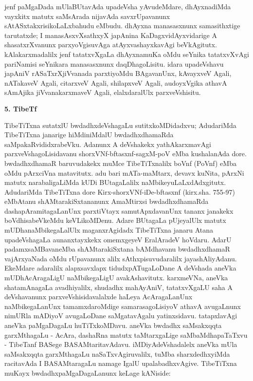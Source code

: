 jenf paMgaDada mUlaBUtavAda upadeVsha yAvudeMdare, dhAyxnadiMda vayxkitx matutx saMsArada nijavAda savxrUpavanunx sAtASxtakxrisikoLaLxbahudu eMbudu. dhAyxna manasasxnunx samasithxtige tarutatxde; I manasAsxvXsathxyX japAnina KaDagxvidAyxvidarige A shasatxrXvanunx parxyoVgisuvAga atAyxvashayxkavAgi beVkAgitutx. kAlakarxmadalilx jenf tatatxvXgaLa dhAyxnamuKa oMdu seYnika tatatxvXvAgi pariNamisi seYnikara manasasxnunx daqDhagoLisitu. idara upadeVshavu japAniV rASaTxrXjiVvanada parxtiyoMdu BAgavanUnx, kAvayxveV Agali, nATakaveV Agali, citarxveV Agali, shilapxveV Agali, audoyxVgika athavA sAmAjika jiVvanakarxmaveV Agali, elalxdaralUlx parxveVshisitu.

\begin{center}
{\textbf{\Large 5. TibeTf}}
\end{center}

TibeTiTxna sutatxlU bwdadhxdeVshagaLu sutitxkoMDidadxvu; AdudariMda TibeTiTxna janarige hiMdiniMdalU bwdadhxdhamaRda saMpakaRvididxrabeVku. Adanunx A deVshakekx yathAkarxmavAgi parxveVshagoLisidavanu shorxVNf-bftasxnf-sagxM-poV eMba kushalanAda dore. bwdadhxdhamaR baruvudakekx muMce TibeTiTxnalilx boVnf (PoVnf) eMba oMdu pArxciVna matavitutx. adu bari mATa-maMtarx, devavx kuNita, pArxNi matutx narabaligaLiMda kUDi BUtagaLalilx naMbikeyuLaLxdAdxgitutx. AdudariMda TibeTiTxna dore Kirx-shorxVNf-iDe-bftasxnf (kirx.sha. 755-97) eMbAtanu shAMtarakiSxtananunx AmaMtirxsi bwdadhxdhamaRda dashapAramitagaLanUnx parxtiVtayx samutApxdavanUnx tananx janakekx boVdhisabeVkeMdu keVLikoMDenu. Adare BUtagaLa pUjeyalUlx matutx mUDhanaMbikegaLalUlx maganxrAgidadx TibeTiTxna janaru Atana upadeVshagaLa aunanxtayxkekx omemxgeyeV EralAradeV hoVdaru. AdarU padamxsaMBavaneMba shAMtarakiSxtana bAMdhavanu bwdadhxdhamaR vajArxyaNada oMdu rUpavanunx alilx sAthxpisuvudaralilx jayashAliyAdanu. EkeMdare adaralilx alapxsavxlapx tidudxpATugaLoDane A deVshada aneVka mUDhAcAragaLigU naMbikegaLigU avakAshavitutx. karxmeVNa, aneVka shatamAnagaLa avadhiyalilx, shudadhx mahAyAniV, tatatxvXgaLU saha A deVshavanunx parxveVshisidavalalxde haLeya AcAragaLanUnx naMbikegaLanUnx tamamxdaroMdige samarasagoLisiyoV athavA avugaLnunx nimURla mADiyoV avugaLoDane saMgatavAgalu yatinxsidavu. tatapxlavAgi aneVka paMgaDagaLu huTiTxkoMDavu. aneVka bwdadhx saMsakxqqta garxMthagaLu - AcAra, dashaRna matutx taMtarxgaLige saMbaMdhapaTaTxvu - TibeTanf BASege BASAMtaritavAdavu. iMDiyAdeVshadalelx aneVka mUla saMsakxqqta garxMthagaLu naSaTxvAgiruvalilx, tuMba sharxdedhxyiMda racitavAda I BASAMtaragaLu namage IgalU upalabadhxvAgive. TibeTiTxna muKayx bwdadhxpaMgaDagaLanunx keLage kANiside:

